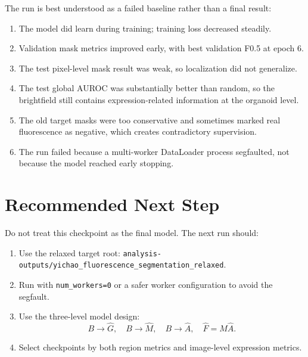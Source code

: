 \documentclass[11pt]{article}
\begin{document}
The run is best understood as a failed baseline rather than a final result:

\begin{enumerate}
\item The model did learn during training; training loss decreased steadily.
\item Validation mask metrics improved early, with best validation F0.5 at epoch 6.
\item The test pixel-level mask result was weak, so localization did not generalize.
\item The test global AUROC was substantially better than random, so the brightfield still
contains expression-related information at the organoid level.
\item The old target masks were too conservative and sometimes marked real fluorescence as
negative, which creates contradictory supervision.
\item The run failed because a multi-worker DataLoader process segfaulted, not because the
model reached early stopping.
\end{enumerate}

\section{Recommended Next Step}

Do not treat this checkpoint as the final model. The next run should:

\begin{enumerate}
\item Use the relaxed target root:
\texttt{analysis-outputs/yichao\_fluorescence\_segmentation\_relaxed}.
\item Run with \texttt{num\_workers=0} or a safer worker configuration to avoid the
segfault.
\item Use the three-level model design:
\[
B \rightarrow \hat{G}, \quad B \rightarrow \hat{M}, \quad B \rightarrow \hat{A},
\quad \hat{F}=\hat{M}\hat{A}.
\]
\item Select checkpoints by both region metrics and image-level expression metrics.
\end{enumerate}
\end{document}
